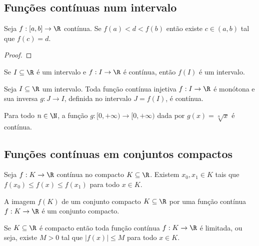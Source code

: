 \documentclass{article}
\begin{document}
\subsection{Funções contínuas num intervalo}

\begin{thm}  \label{thm:tvi}
    Seja \(f: [a, b] \to \R\) contínua. Se \(f(a) < d < f(b)\) então existe \(c \in (a, b)\) tal que \(f(c) = d\).
\end{thm}

\begin{proof}
    
\end{proof}

\begin{cor}
    Se \(I \subseteq \R\) é um intervalo e \(f: I \to \R\) é contínua, então \(f(I)\) é um intervalo.
\end{cor}

\begin{prop}
    Seja \(I \subseteq \R\) um intervalo. Toda função contínua injetiva \(f: I \to \R\) é monótona e sua inversa \(g: J \to I\), definida no intervalo \(J = f(I)\), é contínua.
\end{prop}

\begin{cor}
    Para todo \(n \in \N\), a função \(g: [0, +\infty) \to [0, +\infty)\) dada por \(g(x) = \sqrt[n]{x}\) é contínua.
\end{cor}

\subsection{Funções contínuas em conjuntos compactos}

\begin{thm} [Weierstrass] \label{thm:weierstrass}
    Seja \(f: K \to \R\) contínua no compacto \(K \subseteq \R\). Existem \(x_0, x_1 \in K\) tais que \(f(x_0) \leq f(x) \leq f(x_1)\) para todo \(x \in K\).
\end{thm}

\begin{prop}
    A imagem \(f(K)\) de um conjunto compacto \(K \subseteq \R\) por uma função contínua \(f: K \to \R\) é um conjunto compacto.
\end{prop}

\begin{cor}
    Se \(K \subseteq \R\) é compacto então toda função contínua \(f: K \to \R\) é limitada, ou seja, existe \(M > 0\) tal que \(|f(x)| \leq M\) para todo \(x \in K\).
\end{cor}
\end{document}
